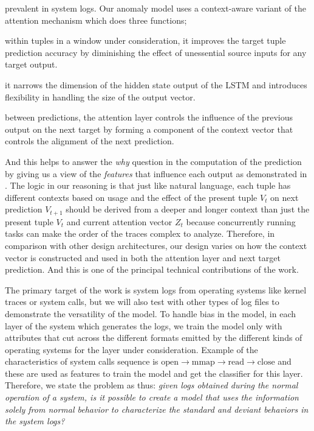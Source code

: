 prevalent in system logs. Our anomaly model uses a context-aware variant of the 
attention mechanism which does three functions; 
\begin{enumerate*}[label={\alph*)},font={\bfseries}]
	\item within tuples in a window under consideration, it improves the target 
	tuple prediction accuracy by diminishing the effect of unessential source 
	inputs for any target output.
	\item it narrows the dimension of the hidden state output of the LSTM and 
	introduces flexibility in handling the size of the output vector.
	\item between predictions, the attention layer controls the influence of 
	the previous output on the next target by forming a component of the 
	context vector that controls the alignment of the next prediction.
\end{enumerate*}
And this helps to answer the \emph{why} question in the 
computation of the prediction by giving us a view of the \emph{features} that 
influence each output as demonstrated in \cite{chan2016listen}. The logic in 
our reasoning is that just like natural language, each tuple has different 
contexts based on usage and the effect of the present tuple $ V_t $ on next 
prediction $ V_{t+1} $ should be derived from a deeper and longer context than 
just the present tuple $ V_t $ and current attention vector $ Z_t $ because 
concurrently running tasks can make the order of the traces complex to analyze. 
Therefore, in comparison with other design architectures, our design varies on 
how the context vector is constructed and used in both the attention layer and 
next target prediction. And this is one of the principal technical 
contributions of the work. \par
The primary target of the work is system logs from operating systems like 
kernel traces or system calls, but we will also test with other types of log 
files to demonstrate the versatility of the model. To handle bias in the model, 
in each layer of the system which generates the logs, we train the model only 
with attributes that cut across the different formats emitted by the different 
kinds of operating systems for the layer under consideration. Example of the 
characteristics of system calls sequence is $\text{open} \longrightarrow
\text{mmap} \longrightarrow \text{read} \longrightarrow \text{close}$ and 
these are used as features to train the model and get the classifier for this 
layer. Therefore, we state the problem as thus: \emph{given logs obtained 
during the normal operation of a system, is it possible to create a model that 
uses the information solely from normal behavior to characterize the standard 
and deviant behaviors in the system logs?} \par
